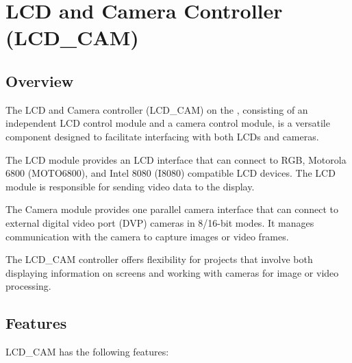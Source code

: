 \documentclass[main\_\_EN.tex]{subfiles}
\begin{document}

\ifglobal
\else
    {\let\clearpage\relax \listoftodos}
    {\let\clearpage\relax \listofdonetodos}
    \tableofcontents
\fi


\hypertarget{camlcdctrl}{}
\chapter{LCD and Camera Controller (LCD\_CAM)}
\label{mod:camlcdctrl}

\section{Overview}

The LCD and Camera controller (LCD\_CAM) on the \chipname{}, consisting of an independent LCD control module and a camera control module, is a versatile component designed to facilitate interfacing with both LCDs and cameras.

The LCD module provides an LCD interface that can connect to RGB, Motorola 6800 (MOTO6800), and Intel 8080 (I8080) compatible LCD devices. The LCD module is responsible for sending video data to the display.

The Camera module provides one parallel camera interface that can connect to external digital video port (DVP) cameras in 8/16-bit modes. It manages communication with the camera to capture images or video frames.

The LCD\_CAM controller offers flexibility for projects that involve both displaying information on screens and working with cameras for image or video processing.

\section{Features}

LCD\_CAM has the following features:
\end{document}
